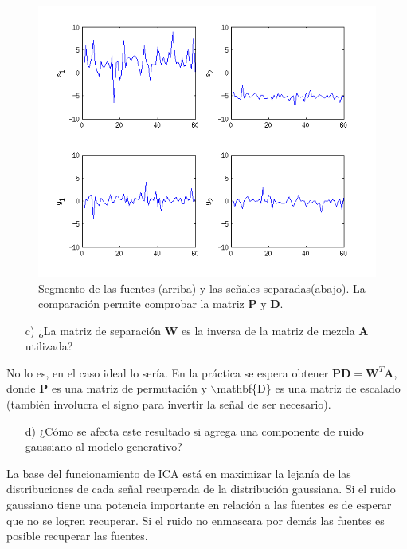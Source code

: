\documentclass[11pt,a4paper,final]{article}
\begin{document}
\begin{figure}
\includegraphics [width=\textwidth]{Ejercicio4_02.png}
\caption{Segmento de las fuentes (arriba) y las señales separadas(abajo). La comparación permite comprobar la matriz $\mathbf{P}$ y $\mathbf{D}$.}
\label{fig:ejercicio41}
\end{figure}


\begin{enumerate}
   \item[c)] ¿La matriz de separación $\mathbf{W}$ es la inversa de la matriz de mezcla $\mathbf{A}$ utilizada?
\end{enumerate}

No lo es, en el caso ideal lo sería. En la práctica se espera obtener $\mathbf{P} \mathbf{D} = \mathbf{W}^T\mathbf{A}$, donde $\mathbf{P}$ es una matriz de permutación y \ensuremath{\backslash}mathbf\{D\} es una matriz de escalado (también involucra el signo para invertir la señal de ser necesario).

\begin{enumerate}

   \item[d)]  ¿Cómo se afecta este resultado si agrega una componente de ruido gaussiano al modelo generativo?
\end{enumerate}

La base del funcionamiento de ICA está en maximizar la lejanía de las distribuciones de cada señal recuperada de la distribución gaussiana. Si el ruido gaussiano tiene una potencia importante en relación a las fuentes es de esperar que no se logren recuperar. Si el ruido no enmascara por demás las fuentes es posible recuperar las fuentes.
\end{document}
